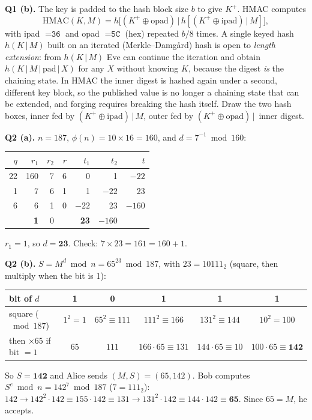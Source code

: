 \textbf{Q1 (b).} The key is padded to the hash block size $b$ to give $K^+$. HMAC computes
\[
\text{HMAC}(K, M) = h\bigl[(K^+ \oplus \text{opad}) \,|\, h[(K^+ \oplus \text{ipad}) \,|\, M]\bigr],
\]
with ipad $= \texttt{36}$ and opad $= \texttt{5C}$ (hex) repeated $b/8$ times. A single keyed hash $h(K \,|\, M)$ built on an iterated (Merkle--Damg\aa rd) hash is open to \emph{length extension}: from $h(K \,|\, M)$ Eve can continue the iteration and obtain $h(K \,|\, M \,|\, \text{pad} \,|\, X)$ for any $X$ without knowing $K$, because the digest \emph{is} the chaining state. In HMAC the inner digest is hashed again under a second, different key block, so the published value is no longer a chaining state that can be extended, and forging requires breaking the hash itself. Draw the two hash boxes, inner fed by $(K^+ \oplus \text{ipad}) \,|\, M$, outer fed by $(K^+ \oplus \text{opad}) \,|\,$ inner digest.

\textbf{Q2 (a).} $n = 187$, $\phi(n) = 10 \times 16 = 160$, and $d = 7^{-1} \bmod 160$:
\begin{center}\small
\begin{tabular}{@{}rrrrrrr@{}}
\toprule
$q$ & $r_1$ & $r_2$ & $r$ & $t_1$ & $t_2$ & $t$\\
\midrule
22 & 160 & 7 & 6 & 0 & 1 & $-22$\\
1 & 7 & 6 & 1 & 1 & $-22$ & 23\\
6 & 6 & 1 & 0 & $-22$ & 23 & $-160$\\
 & \textbf{1} & 0 & & \textbf{23} & $-160$ & \\
\bottomrule
\end{tabular}
\end{center}
$r_1 = 1$, so $d = \mathbf{23}$. Check: $7 \times 23 = 161 = 160 + 1$.

\textbf{Q2 (b).} $S = M^d \bmod n = 65^{23} \bmod 187$, with $23 = 10111_2$ (square, then multiply when the bit is 1):
\begin{center}\small
\begin{tabular}{@{}lccccc@{}}
\toprule
bit of $d$ & 1 & 0 & 1 & 1 & 1\\
\midrule
square ($\bmod 187$) & $1^2 = 1$ & $65^2 \equiv 111$ & $111^2 \equiv 166$ & $131^2 \equiv 144$ & $10^2 = 100$\\
then $\times 65$ if bit $= 1$ & $65$ & $111$ & $166 \cdot 65 \equiv 131$ & $144 \cdot 65 \equiv 10$ & $100 \cdot 65 \equiv \mathbf{142}$\\
\bottomrule
\end{tabular}
\end{center}
So $S = \mathbf{142}$ and Alice sends $(M, S) = (65, 142)$. Bob computes $S^e \bmod n = 142^7 \bmod 187$ ($7 = 111_2$): $142 \to 142^2 \cdot 142 \equiv 155 \cdot 142 \equiv 131 \to 131^2 \cdot 142 \equiv 144 \cdot 142 \equiv \mathbf{65}$. Since $65 = M$, he accepts.

